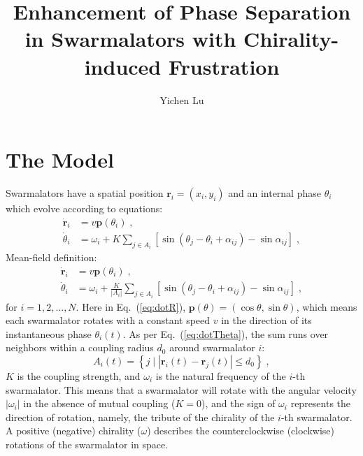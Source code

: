 \documentclass{article}
\title{\textbf{Enhancement of Phase Separation in Swarmalators with Chirality-induced Frustration}}
\author{Yichen Lu}
\begin{document}
\maketitle

\tableofcontents

\newpage
\section{\label{sec:model}The Model}

Swarmalators have a spatial position $\mathbf{r}_i=\left( x_i, y_i \right)$ and an internal phase $\theta_i$ which evolve according to equations:
\begin{subequations}
    \label{eq:totalDynamics}
    \begin{align}
        \dot{\mathbf{r}}_i&=v\mathbf{p}\left( \theta _i \right)\label{eq:dotR}\;,\\
        \dot{\theta}_i&=\omega _i+K\sum_{j\in A_i}{\left[ \sin \left( \theta _j-\theta _i+\alpha _{ij} \right) -\sin \alpha _{ij} \right]}\label{eq:dotTheta}\;,
    \end{align}
\end{subequations}
\color{blue}
Mean-field definition:
\begin{subequations}
    \label{eq:totalDynamicsMeanField}
    \begin{align}
        \dot{\mathbf{r}}_i&=v\mathbf{p}\left( \theta _i \right)\label{eq:dotR}\;,\\
        \dot{\theta}_i&=\omega _i+\frac{K}{\left| A_i \right|}\sum_{j\in A_i}{\left[ \sin \left( \theta _j-\theta _i+\alpha _{ij} \right) -\sin \alpha _{ij} \right]}\label{eq:dotTheta}\;,
    \end{align}
\end{subequations}
\color{black}
for $i=1,2,\ldots,N$. Here in Eq.~(\ref{eq:dotR}), $\mathbf{p}\left( \theta \right) =\left( \cos \theta ,\sin \theta \right)$, which means each swarmalator rotates with a constant speed $v$ in the direction of its instantaneous phase $\theta_i (t)$. As per Eq.~(\ref{eq:dotTheta}), the sum runs over neighbors within a coupling radius $d_0$ around swarmalator $i$:
\begin{equation}
    A_i\left( t \right) =\left\{ j\mid \left| \mathbf{r}_i\left( t \right) -\mathbf{r}_j\left( t \right) \right|\leqslant d_0 \right\} \;,
\end{equation}
$K$ is the coupling strength, and $\omega_i$ is the natural frequency of the $i$-th swarmalator. 
This means that a swarmalator will rotate with the angular velocity $|\omega_i |$ in the absence of mutual coupling ($K=0$), and the sign of $\omega_i$ represents the direction of rotation, namely, the tribute of the chirality of the $i$-th swarmalator. A positive (negative) chirality ($\omega$) describes the counterclockwise (clockwise) rotations of the swarmalator in space. 
\end{document}
